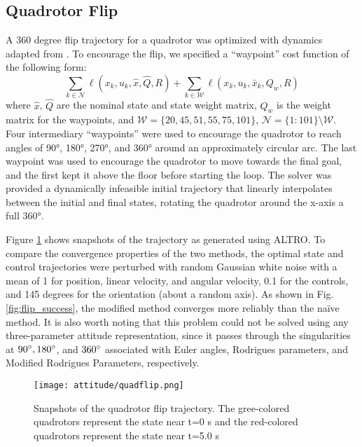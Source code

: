 \documentclass[../root.tex]{subfiles}
\begin{document}
    \subsection{Quadrotor Flip}
        A 360 degree flip trajectory for a quadrotor was optimized with dynamics adapted
        from \cite{mellinger_Trajectory_2012}. To encourage the flip, we specified a 
        ``waypoint'' cost function of the following form:
        \begin{equation}
                  \sum_{k \in \mathcal{N}} \ell(x_k, u_k, \hat{x}, \hat{Q}, R) 
                + \sum_{k \in \mathcal{W}} \ell(x_k, u_k, \bar{x}_k, Q_w, R) 
        \end{equation}
        where $\hat{x}$, $\hat{Q}$ are the nominal state and state weight matrix, $Q_w$ is 
        the weight matrix for the waypoints, and
        $\mathcal{W} = \{20,45,51,55,75,101\}$, $\mathcal{N} = \{1:101\} \setminus
        \mathcal{W}$.
        Four intermediary ``waypoints'' were used to encourage the quadrotor
        to reach angles of \ang{90}, \ang{180}, \ang{270}, and \ang{360}
        around an approximately circular arc. The last waypoint was used to
        encourage the quadrotor to move towards the final goal, and the first
        kept it above the floor before starting the loop. The solver was
        provided a dynamically infeasible initial trajectory that linearly
        interpolates between the initial and final states, rotating the
        quadrotor around the x-axis a full \ang{360}.

	    Figure \ref{fig:quad_flip} shows snapshots of the trajectory as
	    generated using ALTRO. To compare the convergence properties of the
	    two methods, the optimal state and control trajectories were
	    perturbed with random Gaussian white noise with a mean of 1 for
	    position, linear velocity, and angular velocity, 0.1 for the
        controls, and 145 degrees for the orientation (about a random axis). 
        As shown in Fig. \ref{fig:flip_success}, the modified method converges
        more reliably than the na\"ive method.
	    It is also worth noting that this problem could not be solved using
	    any three-parameter attitude representation, since it passes through
	    the singularities at $90^{\circ}, 180^{\circ}$, and $360^{\circ}$
	    associated with Euler angles, Rodrigues parameters, and Modified
	    Rodrigues Parameters, respectively.

        \begin{figure}[t]
            \centering
            \texttt{[image: attitude/quadflip.png]}
            \caption{Snapshots of the quadrotor flip trajectory. The
                gree-colored quadrotors represent the state near t=0 s and the
                red-colored quadrotors represent the state near t=5.0 s
            }
            \label{fig:quad_flip}
        \end{figure}
\end{document}
